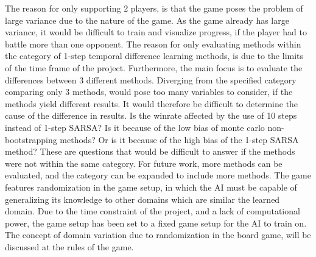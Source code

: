 The reason for only supporting 2 players, is that the game poses the problem of large variance due to the nature of the game. As the game already has large variance, it would be difficult to train and visualize progress, if the player had to battle more than one opponent. 
The reason for only evaluating methods within the category of 1-step temporal difference learning methods, is due to the limits of the time frame of the project. Furthermore, the main focus is to evaluate the differences between 3 different methods. Diverging from the specified category comparing only 3 methods, would pose too many variables to consider, if the methods yield different results. It would therefore be difficult to determine the cause of the difference in results. Is the winrate affected by the use of 10 steps instead of 1-step SARSA? Is it because of the low bias of monte carlo non-bootstrapping methods? Or is it because of the high bias of the 1-step SARSA method? These are questions that would be difficult to answer if the methods were not within the same category. For future work, more methods can be evaluated, and the category can be expanded to include more methods.
The game features randomization in the game setup, in which the AI must be capable of generalizing its knowledge to other domains which are similar the learned domain. Due to the time constraint of the project, and a lack of computational power, the game setup has been set to a  fixed game setup for the AI to train on. The concept of domain variation due to randomization in the board game, will be discussed at the rules of the game.

